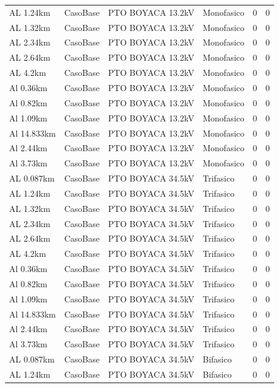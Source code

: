 \documentclass[11pt,a4paper]{article}
\begin{document}
\begin{longtable}{llllrr}
AL 1.24km & CasoBase & PTO BOYACA 13.2kV & Monofasico & 0 & 0 \\
AL 1.32km & CasoBase & PTO BOYACA 13.2kV & Monofasico & 0 & 0 \\
AL 2.34km & CasoBase & PTO BOYACA 13.2kV & Monofasico & 0 & 0 \\
AL 2.64km & CasoBase & PTO BOYACA 13.2kV & Monofasico & 0 & 0 \\
AL 4.2km & CasoBase & PTO BOYACA 13.2kV & Monofasico & 0 & 0 \\
Al 0.36km & CasoBase & PTO BOYACA 13.2kV & Monofasico & 0 & 0 \\
Al 0.82km & CasoBase & PTO BOYACA 13.2kV & Monofasico & 0 & 0 \\
Al 1.09km & CasoBase & PTO BOYACA 13.2kV & Monofasico & 0 & 0 \\
Al 14.833km & CasoBase & PTO BOYACA 13.2kV & Monofasico & 0 & 0 \\
Al 2.44km & CasoBase & PTO BOYACA 13.2kV & Monofasico & 0 & 0 \\
Al 3.73km & CasoBase & PTO BOYACA 13.2kV & Monofasico & 0 & 0 \\
AL 0.087km & CasoBase & PTO BOYACA 34.5kV & Trifasico & 0 & 0 \\
AL 1.24km & CasoBase & PTO BOYACA 34.5kV & Trifasico & 0 & 0 \\
AL 1.32km & CasoBase & PTO BOYACA 34.5kV & Trifasico & 0 & 0 \\
AL 2.34km & CasoBase & PTO BOYACA 34.5kV & Trifasico & 0 & 0 \\
AL 2.64km & CasoBase & PTO BOYACA 34.5kV & Trifasico & 0 & 0 \\
AL 4.2km & CasoBase & PTO BOYACA 34.5kV & Trifasico & 0 & 0 \\
Al 0.36km & CasoBase & PTO BOYACA 34.5kV & Trifasico & 0 & 0 \\
Al 0.82km & CasoBase & PTO BOYACA 34.5kV & Trifasico & 0 & 0 \\
Al 1.09km & CasoBase & PTO BOYACA 34.5kV & Trifasico & 0 & 0 \\
Al 14.833km & CasoBase & PTO BOYACA 34.5kV & Trifasico & 0 & 0 \\
Al 2.44km & CasoBase & PTO BOYACA 34.5kV & Trifasico & 0 & 0 \\
Al 3.73km & CasoBase & PTO BOYACA 34.5kV & Trifasico & 0 & 0 \\
AL 0.087km & CasoBase & PTO BOYACA 34.5kV & Bifasico & 0 & 0 \\
AL 1.24km & CasoBase & PTO BOYACA 34.5kV & Bifasico & 0 & 0 \\

\end{longtable}
\end{document}
